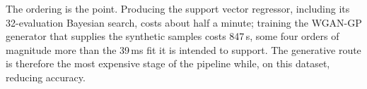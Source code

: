 \documentclass[pdflatex,sn-basic,Numbered]{sn-jnl}
\begin{document}
The ordering is the point. Producing the support vector regressor, including its
32-evaluation Bayesian search, costs about half a minute; training the WGAN-GP
generator that supplies the synthetic samples costs 847\,s, some four orders of
magnitude more than the 39\,ms fit it is intended to support. The generative
route is therefore the most expensive stage of the pipeline while, on this
dataset, reducing accuracy.


\end{document}
